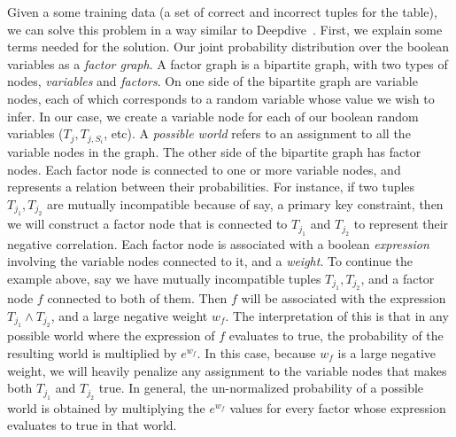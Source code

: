 \documentclass{sig-alternate}
\newcounter{prob}
\begin{document}
Given a some training data (a set of correct and incorrect tuples for the table), we can solve this problem in a way similar to Deepdive~\cite{deepdive,Niu_deepdive:web-scale}. First, we explain some terms needed for the solution. Our joint probability distribution over the boolean variables as a \textit{factor graph}. A factor graph is a bipartite graph, with two types of nodes, \textit{variables} and \textit{factors}. On one side of the bipartite graph are variable nodes, each of which corresponds to a random variable whose value we wish to infer. In our case, we create a variable node for each of our boolean random variables ($T_j, T_{j, S_i}$, etc). A \textit{possible world} refers to an assignment to all the variable nodes in the graph. The other side of the bipartite graph has factor nodes. Each factor node is connected to one or more variable nodes, and represents a relation between their probabilities. For instance, if two tuples $T_{j_1}, T_{j_2}$ are mutually incompatible because of say, a primary key constraint, then we will construct a factor node that is connected to $T_{j_1}$ and $T_{j_2}$ to represent their negative correlation. Each factor node is associated with a boolean \textit{expression} involving the variable nodes connected to it, and a \textit{weight}. To continue the example above, say we have mutually incompatible tuples $T_{j_1}, T_{j_2}$, and a factor node $f$ connected to both of them. Then $f$ will be associated with the expression $T_{j_1} \land T_{j_2}$, and a large negative weight $w_f$. The interpretation of this is that in any possible world where the expression of $f$ evaluates to true, the probability of the resulting world is multiplied by $e^{w_f}$. In this case, because $w_f$ is a large negative weight, we will heavily penalize any assignment to the variable nodes that makes both $T_{j_1}$ and $T_{j_2}$ true. In general, the un-normalized probability of a possible world is obtained by multiplying the $e^{w_f}$ values for every factor whose expression evaluates to true in that world. 
\end{document}
